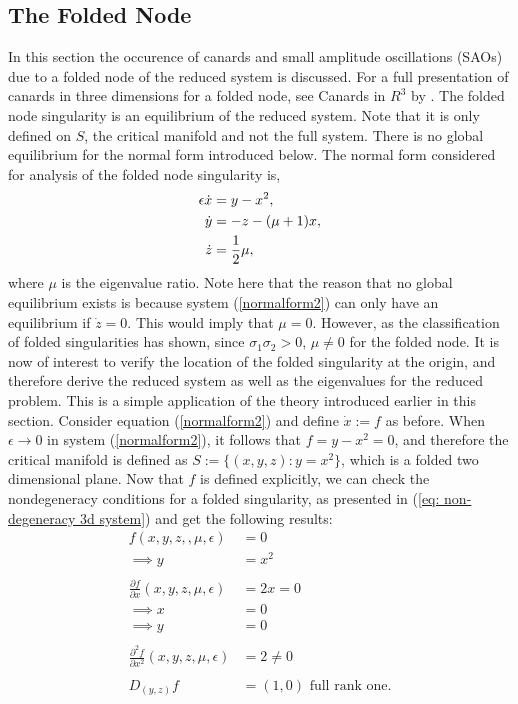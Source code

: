 \subsection{The Folded Node}
In this section the occurence of canards and small amplitude oscillations (SAOs) due to a folded node of the reduced system is discussed. For a full presentation of canards in three dimensions for a folded node, see Canards in $ R^3 $ by  \citet{wechselberger2005}.
The folded node singularity is an equilibrium of the reduced system. Note that it is only defined on $S$, the critical manifold and not the full system. There is no global equilibrium for the normal form introduced below.
The normal form considered for analysis of the folded node singularity is,
\begin{align}\label{normalform2}
\epsilon \dot{x} &= y - x^2,\\ \notag
\dot{y} &=- z -(\mu +1)x, \\
\dot{z} &= \frac{1}{2} \mu, \notag
\end{align}
where $\mu$ is the eigenvalue ratio. Note here that the reason that no global equilibrium exists is because system (\ref{normalform2}) can only have an equilibrium if $\dot{z} =0$. This would imply that $\mu=0$. However, as the classification of folded singularities has shown, since $\sigma_1 \sigma_2 >0$,  $\mu \neq 0$ for the folded node.
It is now of interest to verify the location of the folded singularity at the origin, and therefore derive the reduced system as well as the eigenvalues for the reduced problem.
This is a simple application of the theory introduced earlier in this section.
Consider equation (\ref{normalform2}) and define $\dot{x}:=f$ as before. When $\epsilon \to 0$ in system (\ref{normalform2}), it follows that $f= y-x^2 =0$, and therefore the critical manifold is defined as $S:= \{ (x,y,z) : y=x^2\}$, which is a folded two dimensional plane.
Now that $f$ is defined explicitly, we can check the nondegeneracy conditions for a folded singularity, as presented in (\ref{eq: non-degeneracy 3d system}) and get the following results:
\begin{align*}
f(x,y,z,,\mu, \epsilon) &= 0\\
\implies y&=x^2\\
\\
\frac{\partial f}{\partial x} (x,y,z,\mu,\epsilon) &= 2x = 0\\
\implies x&=0 \\
\implies y&=0 \\
\\
\frac{\partial^2 f}{\partial x^2}(x,y,z,\mu,\epsilon) & = 2 \neq 0\\
\\
D_{(y,z)}f&= (1,0) \textrm{ full rank one}.
\end{align*}
